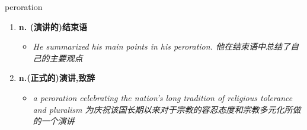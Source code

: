 
\begin{frame}
{\huge peroration}
\begin{center}
\begin{enumerate}\Large
  \item \textbf{n. (演讲的)结束语}
  \begin{itemize}
    \item \em{\Large{He summarized his main points in his peroration. 他在结束语中总结了自己的主要观点}}
  \end{itemize}
  \item \textbf{n.(正式的)演讲,致辞}
  \begin{itemize}
    \item \em{\Large{a peroration celebrating the nation's long tradition of religious tolerance and pluralism 为庆祝该国长期以来对于宗教的容忍态度和宗教多元化所做的一个演讲}}
  \end{itemize}
\end{enumerate}
\end{center}
\end{frame}
